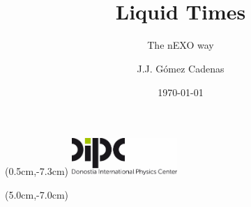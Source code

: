 \documentclass [aspectratio=169]{beamer}
\title[]{\vspace{60pt} \\
Liquid Times} %
\subtitle{The nEXO way}
\author[]{J.J. Gómez Cadenas}
\institute[]{Donostia International Physics Center}
\date{\today}
\begin{document}
{
\begin{frame}
    \titlepage
    \begin{textblock*}{4cm}(0.5cm,-7.3cm)
        \includegraphics[width=4cm]{dipc.png}
    \end{textblock*}
    \begin{textblock*}{8cm}(5.0cm,-7.0cm)
        \huge {} %
    \end{textblock*}
\end{frame}
}
\end{document}
